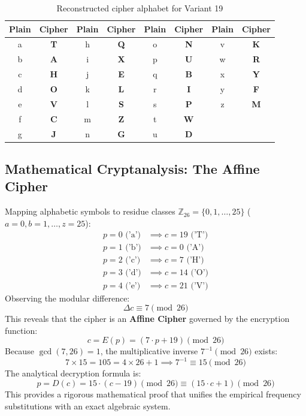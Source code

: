 \documentclass[12pt,a4paper]{article}
\begin{document}
\begin{table}[H]
\centering
\caption{Reconstructed cipher alphabet for Variant 19}
\label{tab:reconstructed_key}
\small
\begin{tabular}{cc|cc|cc|cc}
\toprule
\textbf{Plain} & \textbf{Cipher} & \textbf{Plain} & \textbf{Cipher} & \textbf{Plain} & \textbf{Cipher} & \textbf{Plain} & \textbf{Cipher} \\
\midrule
a & \textbf{T} & h & \textbf{Q} & o & \textbf{N} & v & \textbf{K} \\
b & \textbf{A} & i & \textbf{X} & p & \textbf{U} & w & \textbf{R} \\
c & \textbf{H} & j & \textbf{E} & q & \textbf{B} & x & \textbf{Y} \\
d & \textbf{O} & k & \textbf{L} & r & \textbf{I} & y & \textbf{F} \\
e & \textbf{V} & l & \textbf{S} & s & \textbf{P} & z & \textbf{M} \\
f & \textbf{C} & m & \textbf{Z} & t & \textbf{W} &   &            \\
g & \textbf{J} & n & \textbf{G} & u & \textbf{D} &   &            \\
\bottomrule
\end{tabular}
\end{table}

\subsection{Mathematical Cryptanalysis: The Affine Cipher}
Mapping alphabetic symbols to residue classes $\mathbb{Z}_{26} = \{0, 1, \dots, 25\}$ ($a=0, b=1, \dots, z=25$):
\begin{align*}
    p = 0 \text{ ('a')} &\implies c = 19 \text{ ('T')} \\
    p = 1 \text{ ('b')} &\implies c = 0 \text{ ('A')} \\
    p = 2 \text{ ('c')} &\implies c = 7 \text{ ('H')} \\
    p = 3 \text{ ('d')} &\implies c = 14 \text{ ('O')} \\
    p = 4 \text{ ('e')} &\implies c = 21 \text{ ('V')}
\end{align*}
Observing the modular difference:
\begin{equation}
    \Delta c \equiv 7 \pmod{26}
\end{equation}
This reveals that the cipher is an \textbf{Affine Cipher} governed by the encryption function:
\begin{equation}
    c = E(p) = (7 \cdot p + 19) \pmod{26}
\end{equation}
Because $\gcd(7, 26) = 1$, the multiplicative inverse $7^{-1} \pmod{26}$ exists:
\begin{equation}
    7 \times 15 = 105 = 4 \times 26 + 1 \implies 7^{-1} \equiv 15 \pmod{26}
\end{equation}
The analytical decryption formula is:
\begin{equation}
    p = D(c) = 15 \cdot (c - 19) \pmod{26} \equiv (15 \cdot c + 1) \pmod{26}
\end{equation}
This provides a rigorous mathematical proof that unifies the empirical frequency substitutions with an exact algebraic system.
\end{document}
